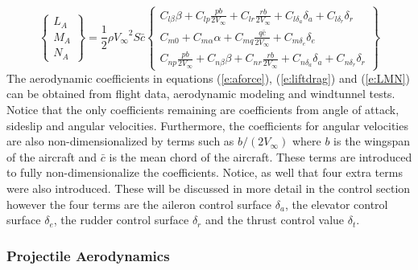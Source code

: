 \documentclass{article}
\begin{document}
\begin{equation}\label{e:LMN}
\begin{Bmatrix} L_A \\ M_A \\ N_A \end{Bmatrix} = \frac{1}2\rho
{V_{\infty}}^2 S \bar{c} \begin{Bmatrix} C_{l\beta}\beta + C_{lp}\frac{pb}{2V_{\infty}} + C_{lr}\frac{rb}{2V_{\infty}} + C_{l\delta_a}{\delta_a} + C_{l\delta_r}{\delta_r}
\\  C_{m0} + C_{m\alpha}\alpha + C_{mq}\frac{q\bar{c}}{2V_{\infty}}+ C_{m\delta_e}\delta_e  \\ C_{np}\frac{pb}{2V_{\infty}} + C_{n\beta}\beta + C_{nr}\frac{rb}{2V_{\infty}} + C_{n\delta_a}\delta_a + C_{n\delta_r}\delta_r \end{Bmatrix}
\end{equation}
The aerodynamic coefficients in equations
(\ref{e:aforce}), (\ref{e:liftdrag}) and (\ref{e:LMN}) can be obtained from
flight data, aerodynamic modeling and windtunnel tests. Notice that
the only coefficients remaining are coefficients from angle of attack,
sideslip and angular velocities. Furthermore, the coefficients for
angular velocities are also non-dimensionalized by terms such as
$b/(2V_{\infty})$ where $b$ is the wingspan of the aircraft and
$\bar{c}$ is the mean chord of the aircraft. These terms are
introduced to fully non-dimensionalize the coefficients. Notice, as
well that four extra terms were also introduced. These will 
be discussed in more detail in the control section however the four
terms are the aileron control surface $\delta_a$, the elevator
control surface $\delta_e$, the rudder control surface $\delta_r$ and
the thrust control value $\delta_t$. 

\subsubsection{Projectile Aerodynamics}
\end{document}
